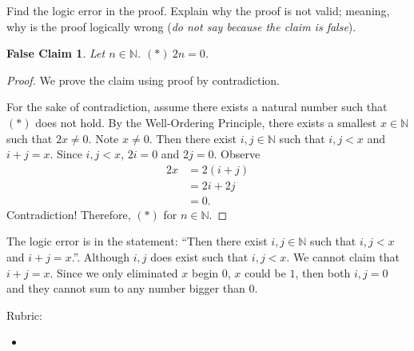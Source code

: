 \documentclass{article}
\newcommand{\N}{\mathbb{N}}
\newtheorem*{falseclaim}{False Claim}
\theoremstyle{definition}
\begin{document}
\begin{question}{4}
    Find the logic error in the proof. Explain why the proof is not valid; meaning, why is the proof logically wrong (\textit{do not say because the claim is false}).
    \begin{falseclaim}
    Let $n\in \mathbb{N}$. $(*) \ 2n=0$.
    \end{falseclaim}
    
    \begin{proof}
    We prove the claim using proof by contradiction.
    
     For the sake of contradiction, assume there exists a natural number such that $(*)$ does not hold. By the Well-Ordering Principle, there exists a smallest $x\in \N$ such that $2x\neq 0$. Note $x\neq 0$. Then there exist  $i, j\in \N$ such that $i, j<x$ and $i+j=x$. Since $i, j <x$, $2i=0$ and $2j=0$. Observe
      \begin{align*}
      2x &= 2(i+j)\\
      & = 2i+2j\\
      & = 0.
      \end{align*}
      Contradiction! Therefore, $(*)$ for $n\in \N$.
    \end{proof}
\end{question}
\begin{solution}
The logic error is in the statement: ``Then there exist  $i, j\in \N$ such that $i, j<x$ and $i+j=x$.''. Although $i, j$ does exist such that $i, j<x$. We cannot claim that $i+j=x$. Since we only eliminated $x$ begin $0$, $x$ could be $1$, then both $i, j=0$ and they cannot sum to any number bigger than 0.

{\color{red} Rubric:
\begin{itemize}
\item 
\end{itemize}}
\end{solution}
\end{document}
